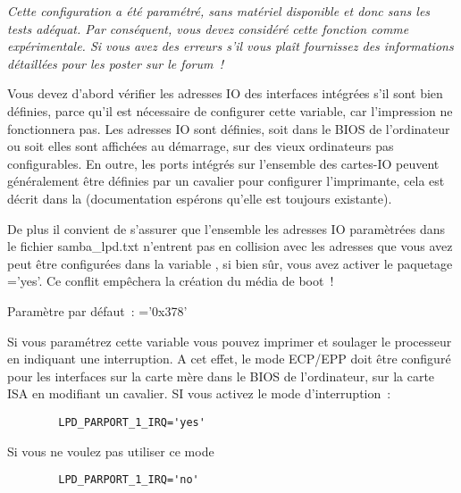 \begin{description}
    \emph{Cette configuration a été paramétré, sans matériel disponible et donc sans
    les tests adéquat. Par conséquent, vous devez considéré cette fonction comme
    expérimentale. Si vous avez des erreurs s'il vous plaît fournissez des
    informations détaillées pour les poster sur le forum~!}

    Vous devez d'abord vérifier les adresses IO des interfaces intégrées s'il
    sont bien définies, parce qu'il est nécessaire de configurer cette variable,
    car l'impression ne fonctionnera pas. Les adresses IO sont définies, soit
    dans le BIOS de l'ordinateur ou soit elles sont affichées au démarrage, sur
    des vieux ordinateurs pas configurables. En outre, les ports intégrés sur
    l'ensemble des cartes-IO peuvent généralement être définies par un cavalier
    pour configurer l'imprimante, cela est décrit dans la (documentation espérons
    qu'elle est toujours existante).

    De plus il convient de s'assurer que l'ensemble les adresses IO paramètrées
    dans le fichier samba\_lpd.txt n'entrent pas en collision avec les adresses
    que vous avez peut être configurées dans la variable ,
    si bien sûr, vous avez activer le paquetage ='yes'.
	Ce conflit empêchera la création du média de boot~!

    Paramètre par défaut~: ='0x378'



        {Si vous paramétrez cette variable  vous
        pouvez imprimer et soulager le processeur en indiquant une interruption.
        A cet effet, le mode ECP/EPP doit être configuré pour les interfaces sur
        la carte mère dans le BIOS de l'ordinateur, sur la carte ISA en modifiant
        un cavalier. SI vous activez le mode d'interruption~:

\begin{example}
\begin{verbatim}
        LPD_PARPORT_1_IRQ='yes'
\end{verbatim}
\end{example}

        Si vous ne voulez pas utiliser ce mode

\begin{example}
\begin{verbatim}
        LPD_PARPORT_1_IRQ='no'
\end{verbatim}
\end{example}

}
\end{description}

